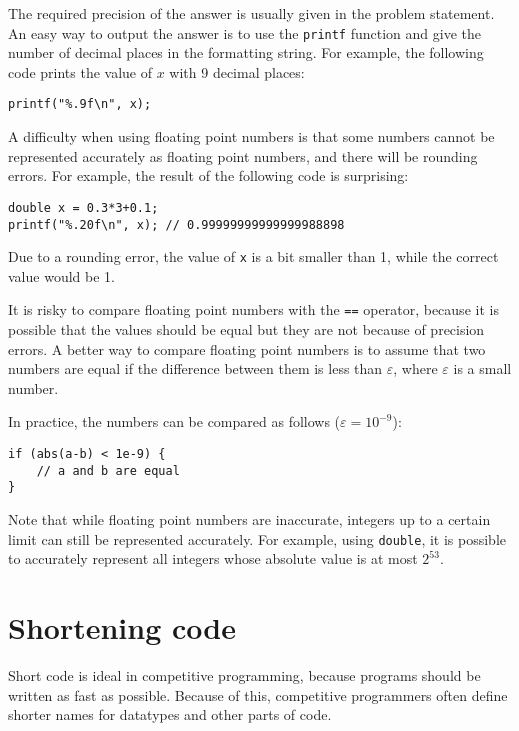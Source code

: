 The required precision of the answer
is usually given in the problem statement.
An easy way to output the answer is to use
the \texttt{printf} function
and give the number of decimal places
in the formatting string.
For example, the following code prints
the value of $x$ with 9 decimal places:

\begin{lstlisting}
printf("%.9f\n", x);
\end{lstlisting}

A difficulty when using floating point numbers
is that some numbers cannot be represented
accurately as floating point numbers,
and there will be rounding errors.
For example, the result of the following code
is surprising:

\begin{lstlisting}
double x = 0.3*3+0.1;
printf("%.20f\n", x); // 0.99999999999999988898
\end{lstlisting}

Due to a rounding error,
the value of \texttt{x} is a bit smaller than 1,
while the correct value would be 1.

It is risky to compare floating point numbers
with the \texttt{==} operator,
because it is possible that the values should be
equal but they are not because of precision errors.
A better way to compare floating point numbers
is to assume that two numbers are equal
if the difference between them is less than $\varepsilon$,
where $\varepsilon$ is a small number.

In practice, the numbers can be compared
as follows ($\varepsilon=10^{-9}$):

\begin{lstlisting}
if (abs(a-b) < 1e-9) {
    // a and b are equal
}
\end{lstlisting}

Note that while floating point numbers are inaccurate,
integers up to a certain limit can still be
represented accurately.
For example, using \texttt{double},
it is possible to accurately represent all
integers whose absolute value is at most $2^{53}$.

\section{Shortening code}

Short code is ideal in competitive programming,
because programs should be written
as fast as possible.
Because of this, competitive programmers often define
shorter names for datatypes and other parts of code.


